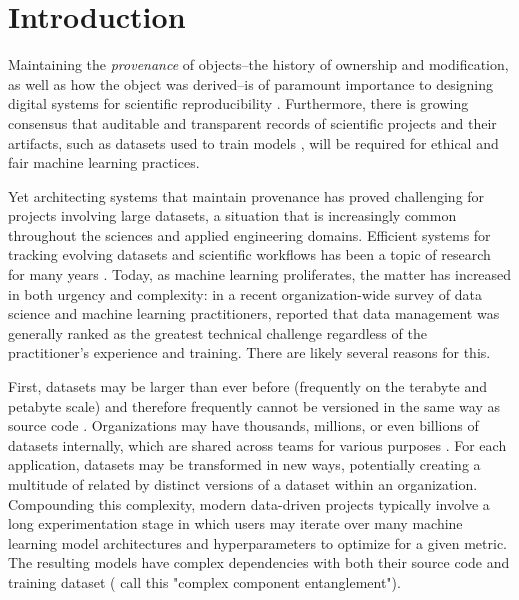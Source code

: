\documentclass[10pt,sigconf, authordraft]{acmart}
\begin{document}
\maketitle

\section{Introduction}
Maintaining the \textit{provenance} of objects--the history of ownership and modification, as well as how the object was derived--is of paramount importance to designing digital systems for scientific reproducibility \cite{Muniswamy-Reddy2006Provenance-awareSystems}. Furthermore, there is growing consensus that auditable and transparent records of scientific projects and their artifacts, such as datasets used to train models \cite{GebruDatasheetsDatasets}, will be required for ethical and fair machine learning practices. 

Yet architecting systems that maintain provenance has proved challenging for projects involving large datasets, a situation that is increasingly common throughout the sciences and applied engineering domains. Efficient systems for tracking evolving datasets and scientific workflows has been a topic of research for many years \cite{Davidson2007ProvenanceSystems.,Azsoyoglu1995TemporalSurvey,Salzberg1999ComparisonData,Bhattacherjee2015PrinciplesTradeoff}. Today, as machine learning proliferates, the matter has increased in both urgency and complexity: in a recent organization-wide survey of data science and machine learning practitioners, \citet{Amershi2019SoftwareStudy} reported that data management was generally ranked as the greatest technical challenge regardless of the practitioner's experience and training. There are likely several reasons for this. 

First, datasets may be larger than ever before (frequently on the terabyte and petabyte scale) and therefore frequently cannot be versioned in the same way as source code \cite{Bhattacherjee2015PrinciplesTradeoff}. Organizations may have thousands, millions, or even billions of datasets internally, which are shared across teams for various purposes \cite{Halevy2016Goods:Datasets}. For each application, datasets may be transformed in new ways, potentially creating a multitude of related by distinct versions of a dataset within an organization.  Compounding this complexity, modern data-driven projects typically involve a long experimentation stage in which users may iterate over many machine learning model architectures and hyperparameters to optimize for a given metric. The resulting models have complex dependencies with both their source code and training dataset (\citet{Amershi2019SoftwareStudy} call this "complex component entanglement"). 
\end{document}
